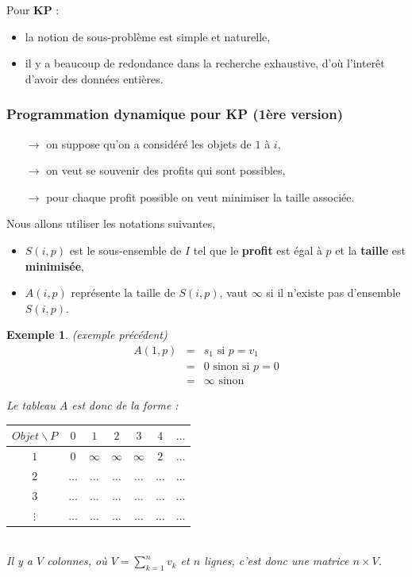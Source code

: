 \documentclass{article}
\newcommand{\titre}[1]{\textcolor{title}{#1}}
\newtheorem{exemple}{Exemple}[section]
\begin{document}
\begin{sffamily}
\noindent Pour \textbf{\titre{KP}} :
\begin{itemize}
\item la notion de sous-problème est simple et naturelle,
\item il y a beaucoup de redondance dans la recherche exhaustive, d'où l'interêt d'avoir des données entières.
\end{itemize}

\newpage

\subsubsection{Programmation dynamique pour \titre{KP} (1ère version)}
\begin{itemize}
\item[$\rightarrow$] on suppose qu'on a considéré les objets de $1$ à $i$,
\item[$\rightarrow$] on veut se souvenir des profits qui sont possibles,
\item[$\rightarrow$] pour chaque profit possible on veut minimiser la taille associée.
\end{itemize}

Nous allons utiliser les notations suivantes,
\begin{itemize}
\item $S(i,p)$ est le sous-ensemble de $I$ tel que le \textbf{profit} est égal à $p$ et la \textbf{taille} est \textbf{minimisée},
\item $A(i,p)$ représente la taille de $S(i,p)$, vaut $\infty$ si il n'existe pas d'ensemble $S(i,p)$.
\end{itemize}

\begin{exemple} \textit{(exemple précédent)}
\begin{eqnarray}
\nonumber A(1,p) & = & s_1 \text{ si }p=v_1 \\
\nonumber 	     & = & 0 \text{ sinon si } p = 0 \\
\nonumber 		 & = & \infty \text{ sinon}
\end{eqnarray}

\newpage

Le tableau $A$ est donc de la forme : 
\begin{center}\begin{tabular}{c|cccccc}
$Objet\backslash P$ & $0$ & $1$ & $2$ & $3$ & $4$ & $\ldots$ \\
\hline
$1$ & $0$ & $\infty$ & $\infty$ & $\infty$ & $2$ & $\ldots$ \\
$2$ & $\ldots$ & $\ldots$ & $\ldots$ & $\ldots$ & $\ldots$ & $\ldots$ \\
$3$ & $\ldots$ & $\ldots$ & $\ldots$ & $\ldots$ & $\ldots$ & $\ldots$ \\
$\vdots$ & $\ldots$ & $\ldots$ & $\ldots$ & $\ldots$ & $\ldots$ & $\ldots$ \\
\end{tabular}\end{center}$ $\\
Il y a $V$ colonnes, où $V = \sum_{k=1}^n v_k$ et $n$ lignes, c'est donc une matrice $n\times V$.
\end{exemple}


\end{sffamily}
\end{document}
